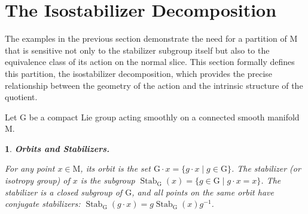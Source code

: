 \documentclass[10pt,reqno,letterpaper,twoside]{amsart}
\theoremstyle{article}
\newtheorem{article}{}
\def\artlabel[#1]{\textbf{#1.}}
\def \G{\mathrm G}
\def \M{\mathrm M}
\DeclareMathOperator{\Stab}{Stab}
\begin{document}
  \section{The Isostabilizer Decomposition}
  \label{sec:Isostabilizer_Decomposition}
  
  The examples in the previous section demonstrate the need for a partition of $\M$ that is sensitive not only to the stabilizer subgroup itself but also to the equivalence class of its action on the normal slice.
  This section formally defines this partition,
  the isostabilizer decomposition,
  which provides the precise relationship between the geometry of the action and the intrinsic structure of the quotient.
  
  Let $\G$ be a compact Lie group acting smoothly on a connected smooth manifold $\M$.
  \begin{article}
    \artlabel[Orbits and Stabilizers]
    \label{Orbits_and_Stabilizers}
    
    For any point $x \in \M$,
    its \emph{orbit} is the set $\G \cdot x = \{g \cdot x \mid g \in \G\}$.
    The \emph{stabilizer} (or isotropy group) of $x$ is the subgroup $\Stab_\G(x) = \{g \in \G \mid g \cdot x = x\}$.
    The stabilizer is a closed subgroup of $\G$,
    and all points on the same orbit have conjugate stabilizers: $\Stab_\G(g \cdot x) = g \Stab_\G(x) g^{-1}$.
    
  \end{article}
  
\end{document}
